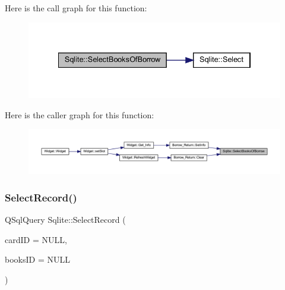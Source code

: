 Here is the call graph for this function\+:
\nopagebreak
\begin{figure}[H]
\begin{center}
\leavevmode
\includegraphics[width=334pt]{class_sqlite_ab9e451e38960661c5a493948453b63c7_cgraph}
\end{center}
\end{figure}
Here is the caller graph for this function\+:
\nopagebreak
\begin{figure}[H]
\begin{center}
\leavevmode
\includegraphics[width=350pt]{class_sqlite_ab9e451e38960661c5a493948453b63c7_icgraph}
\end{center}
\end{figure}
\mbox{\label{class_sqlite_a3c012aa302538385ce05d0b0371a9860}} 
\subsubsection{\texorpdfstring{SelectRecord()}{SelectRecord()}}
{\footnotesize\ttfamily Q\+Sql\+Query Sqlite\+::\+Select\+Record (\begin{DoxyParamCaption}\item[{Q\+String}]{card\+ID = {\ttfamily NULL},  }\item[{Q\+String}]{books\+ID = {\ttfamily NULL} }\end{DoxyParamCaption})}

